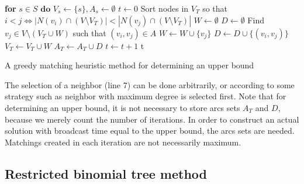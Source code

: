 \begin{algorithm}[]
\textbf{for }$s\in S\textbf{ do } V_s\leftarrow \{s\}, A_s\leftarrow\emptyset$\;
$t\leftarrow 0$\;
 {
	Sort nodes in $V_T$ so that $i<j\Leftrightarrow |N(v_i)\cap(V\setminus V_T)|<|N(v_j)\cap (V\setminus V_T)|$\;
	$W\leftarrow\emptyset$\;
	$D\leftarrow\emptyset$\;
	 {
		Find $v_j\in V\setminus (V_T\cup W)$ such that $(v_i,v_j)\in A$\;
		$W\leftarrow W\cup\{v_j\}$\;
		$D\leftarrow D\cup\{\left(v_i,v_j\right)\}$\;
	}
	$V_T\leftarrow V_T\cup W$\;
	$A_T\leftarrow A_T\cup D$\;
	$t\leftarrow t+1$\;
}
\Return t\;
 \caption{A greedy matching heuristic method for determining an upper bound}
\label{alg:matchheur}
\end{algorithm}
The selection of a neighbor (line 7) can be done arbitrarily, or according to some strategy such as neighbor with maximum degree is selected first.
Note that for determining an upper bound, it is not necessary to store arcs sets $A_T$ and $D$, because we merely count the number of iterations.
In order to construct an actual solution with broadcast time equal to the upper bound, the arcs sets are needed.
Matchings created in each iteration are not necessarily maximum.

\subsection{Restricted binomial tree method}

